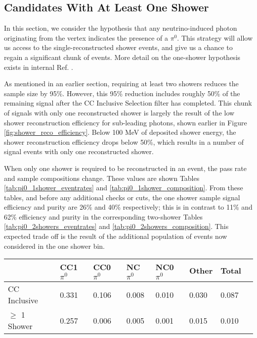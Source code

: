 \subsection{Candidates With At Least One Shower}
In this section, we consider the hypothesis that any neutrino-induced photon originating from the vertex indicates the presence of a $\pi^0$.  This strategy will allow us access to the single-reconstructed shower events, and give us a chance to regain a significant chunk of events. More detail on the one-shower hypothesis exists in internal Ref. \cite{bib:timb_singleshower}.
\par As mentioned in an earlier section, requiring at least two showers reduces the sample size by 95\%.  However, this 95\% reduction includes roughly 50\% of the remaining signal after the CC Inclusive Selection filter has completed. This chunk of signals with only one reconstructed shower is largely the result of the low shower reconstruction efficiency for sub-leading photons, shown earlier in Figure \ref{fig:shower_reco_efficiency}. Below 100 MeV of deposited shower energy, the shower reconstruction efficiency drops below 50\%, which results in a number of signal events with only one reconstructed shower. 
\par When only one shower is required to be reconstructed in an event, the pass rate and sample compositions change.  These values are shown Tables \ref{tab:pi0_1shower_eventrates} and \ref{tab:pi0_1shower_composition}. From these tables, and before any additional checks or cuts, the one shower sample signal efficiency and purity are 26\% and 40\% respectively; this is in contrast to 11\% and 62\% efficiency and purity in the corresponding two-shower Tables \ref{tab:pi0_2showers_eventrates} and \ref{tab:pi0_2showers_composition}. This expected trade off is the result of the additional population of events now considered in the one shower bin.  


\begin{table}[H]
\centering
{}
 \begin{tabular}{| l | l | l |l|l|l|l|l|}
 \hline
 & CC1$\pi^0$ & CC0$\pi^0$ & NC$\pi^0$ & NC0$\pi^0$ & Other & Total \\ [0.1ex] \hline
CC Inclusive & 0.331 & 0.106 & 0.008 & 0.010 & 0.030 & 0.087 \\
$\geq$ 1 Shower & 0.257 & 0.006 & 0.005 & 0.001 & 0.015 & 0.010 \\ \hline
\end{tabular}
\end{table}

